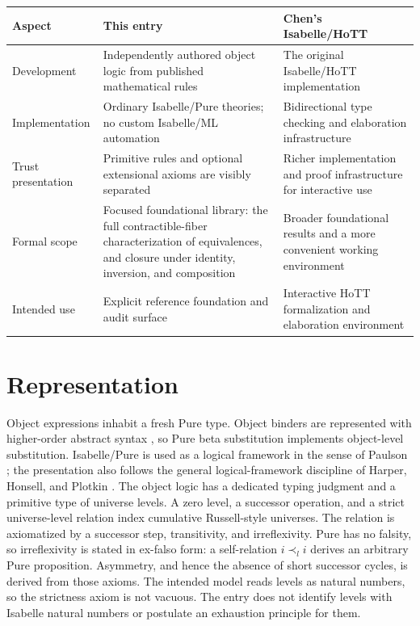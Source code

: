 \documentclass[11pt,a4paper]{article}
\begin{document}
\begin{center}
\small
\begin{tabular}{@{}p{}p{}p{}@{}}
\hline
Aspect & This entry & Chen's Isabelle/HoTT \cite{Chen2021} \\
\hline
Development &
Independently authored object logic from published mathematical rules &
The original Isabelle/HoTT implementation \\
Implementation &
Ordinary Isabelle/Pure theories; no custom Isabelle/ML automation &
Bidirectional type checking and elaboration infrastructure \\
Trust presentation &
Primitive rules and optional extensional axioms are visibly separated &
Richer implementation and proof infrastructure for interactive use \\
Formal scope &
Focused foundational library: the full contractible-fiber characterization of
equivalences, and closure under identity, inversion, and composition &
Broader foundational results and a more convenient working environment \\
Intended use &
Explicit reference foundation and audit surface &
Interactive HoTT formalization and elaboration environment \\
\hline
\end{tabular}
\end{center}

\section{Representation}

Object expressions inhabit a fresh Pure type. Object binders are represented
with higher-order abstract syntax \cite{PfenningElliott1988}, so Pure beta
substitution implements object-level substitution. Isabelle/Pure is used as a
logical framework in the sense of Paulson \cite{Paulson1989,%
WenzelPaulsonNipkow2008}; the presentation
also follows the general logical-framework discipline of
Harper, Honsell, and Plotkin \cite{HarperHonsellPlotkin1993}. The object logic
has a dedicated typing judgment and a primitive type of universe levels. A
zero level, a successor operation, and a strict universe-level relation
index cumulative Russell-style universes. The relation is axiomatized by a
successor step, transitivity, and irreflexivity. Pure has no falsity, so
irreflexivity is stated in ex-falso form: a self-relation \(i \prec_l i\)
derives an arbitrary Pure proposition. Asymmetry, and hence the absence of
short successor cycles, is derived from those axioms. The intended model reads
levels as natural numbers, so the strictness axiom is not vacuous. The entry
does not identify levels with Isabelle natural numbers or postulate an
exhaustion principle for them.
\end{document}
